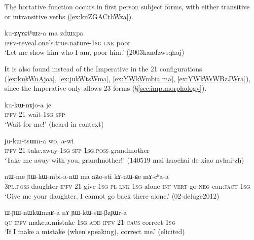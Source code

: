 The hortative function occurs in first person subject forms, with either transitive or intransitive verbs (\ref{ex:kuZGACthWza}).

\begin{exe}
\ex \label{ex:kuZGACthWza}
\gll ku-ʑɣɤɕtʰɯz-a ma zdɯxpa \\
\textsc{ipfv}-reveal.one's.true.nature-\textsc{1sg} \textsc{lnk} poor \\
\glt `Let me show him who I am, poor him.' (2003kandzwsqhaj)
\end{exe}

It is also found instead of the Imperative in the 2\fl{}1 configurations (\ref{ex:kukWnAjoa}, \ref{ex:jukWtsWma}, \ref{ex:YWkWmbia.ma}, \ref{ex:YWkWsWBzJWra}), since the Imperative only allows 2\fl{}3 forms (§\ref{sec:imp.morphology}).

\begin{exe}
	\ex \label{ex:kukWnAjoa}
	\gll ku-kɯ-nɤjo-a je \\
	\textsc{ipfv}-2\fl{}1-wait-\textsc{1sg} \textsc{sfp}  \\
	\glt `Wait for me!' (heard in context)
\end{exe}

\begin{exe}
\ex \label{ex:jukWtsWma}
\gll ju-kɯ-tsɯm-a wo, a-wi \\
\textsc{ipfv}-2\fl{}1-take.away-\textsc{1sg} \textsc{sfp} \textsc{1sg}.\textsc{poss}-grandmother \\
\glt `Take me away with you, grandmother!' (140519 mai huochai de xiao nvhai-zh)
\end{exe}

\begin{exe}
\ex \label{ex:YWkWmbia.ma}
\gll  nɯ-me ɲɯ-kɯ-mbi-a-nɯ ma aʑo-sti kɤ-nɯ-ɕe mɤ-cʰa-a \\
\textsc{3pl}.\textsc{poss}-daughter \textsc{ipfv}-2\fl{}1-give-\textsc{1sg}-\textsc{pl} \textsc{lnk} \textsc{1sg}-alone \textsc{inf}-\textsc{vert}-go \textsc{neg}-can:\textsc{fact}-\textsc{1sg} \\
\glt `Give me your daughter, I cannot go back there alone.' (02-deluge2012)
\end{exe}

\begin{exe}
\ex \label{ex:YWkWsWBzJWra}
\gll ɯ-ɲɯ-nɯkɯmaʁ-a nɤ ɲɯ-kɯ-sɯ-βzɟɯr-a \\
\textsc{qu}-\textsc{ipfv}-make.a.mistake-\textsc{1sg} \textsc{add} \textsc{ipfv}-2\fl{}1-\textsc{caus}-correct-\textsc{1sg} \\
\glt `If I make a mistake (when speaking), correct me.' (elicited)
\end{exe}

